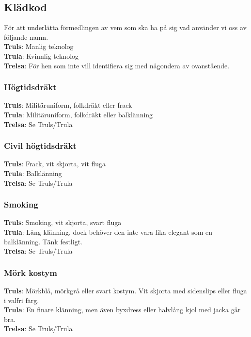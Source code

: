 \subsection*{Klädkod}
För att underlätta förmedlingen av vem som ska ha på sig vad använder vi oss av följande namn.\\

\textbf{Truls}: Manlig teknolog\\
\textbf{Trula}: Kvinnlig teknolog\\
\textbf{Trelsa}: För hen som inte vill identifiera sig med någondera av ovanstående.

\subsubsection*{Högtidsdräkt}

\textbf{Truls}: Militäruniform, folkdräkt eller frack\\
\textbf{Trula}: Militäruniform, folkdräkt eller balklänning\\
\textbf{Trelsa}: Se Truls/Trula

\subsubsection*{Civil högtidsdräkt}

\textbf{Truls}: Frack, vit skjorta, vit fluga\\
\textbf{Trula}: Balklänning\\
\textbf{Trelsa}: Se Truls/Trula

\subsubsection*{Smoking}
\textbf{Truls}: Smoking, vit skjorta, svart fluga\\
\textbf{Trula}: Lång klänning, dock behöver den inte vara lika elegant som en balklänning. Tänk festligt.\\
\textbf{Trelsa}: Se Truls/Trula

\newpage

\subsubsection*{Mörk kostym}
\textbf{Truls}: Mörkblå, mörkgrå eller svart kostym. Vit skjorta med sidenslips eller fluga i valfri färg.\\
\textbf{Trula}: En finare klänning, men även byxdress eller halvlång kjol med jacka går bra.\\
\textbf{Trelsa}: Se Truls/Trula

